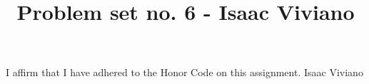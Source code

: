 \documentclass[12pt, reqno]{amsart}
\theoremstyle{definition}
\theoremstyle{remark}
\begin{document}
\title[Math 357 - Harmonic Analysis]{Problem set no. 6 - Isaac Viviano}

\begin{titlepage}
    
\maketitle

I affirm that I have adhered to the Honor Code on this assignment. 
Isaac Viviano

\end{titlepage}









\end{document}
